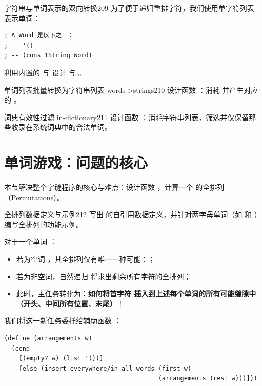 \begin{exercise}{字符串与单词表示的双向转换}{209}
为了便于递归重排字符，我们使用单字符列表  表示单词：
\begin{lstlisting}[language=BSL]
; A Word 是以下之一：
; -- '()
; -- (cons 1String Word)
\end{lstlisting}
利用内置的  与  设计  与 。
\end{exercise}

\begin{exercise}{单词列表批量转换为字符串列表 words->strings}{210}
设计函数 ：消耗  并产生对应的 。
\end{exercise}

\begin{exercise}{词典有效性过滤 in-dictionary}{211}
设计函数 ：消耗字符串列表，筛选并仅保留那些收录在系统词典中的合法单词。
\end{exercise}

\section{单词游戏：问题的核心}
\label{sec:ch12_word_games_heart}

本节解决整个字谜程序的核心与难点：设计函数 ，计算一个  的全排列（Permutations）。

\begin{exercise}{全排列数据定义与示例}{212}
写出  的自引用数据定义，并针对两字母单词（如  和 ）编写全排列的功能示例。
\end{exercise}

对于一个单词 ：
\begin{itemize}
  \item 若为空词 ，其全排列仅有唯一一种可能：；
  \item 若为非空词，自然递归  将求出剩余所有字符的全排列；
  \item 此时，主任务转化为：\textbf{如何将首字符  插入到上述每个单词的所有可能缝隙中（开头、中间所有位置、末尾）}！
\end{itemize}

我们将这一新任务委托给辅助函数 ：
\begin{lstlisting}[language=BSL]
(define (arrangements w)
  (cond
    [(empty? w) (list '())]
    [else (insert-everywhere/in-all-words (first w)
                                          (arrangements (rest w)))]))
\end{lstlisting}

